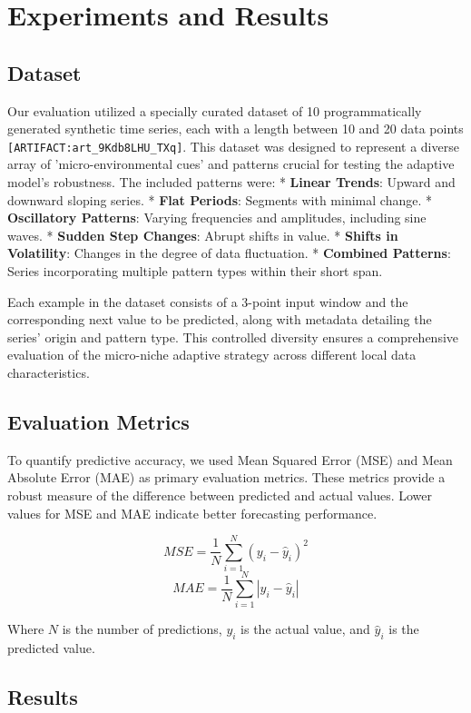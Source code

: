\documentclass[11pt,letterpaper]{article}
\begin{document}
\section{Experiments and Results}

\subsection{Dataset}

Our evaluation utilized a specially curated dataset of 10 programmatically generated synthetic time series, each with a length between 10 and 20 data points \texttt{[ARTIFACT:art\_9Kdb8LHU\_TXq]}. This dataset was designed to represent a diverse array of 'micro-environmental cues' and patterns crucial for testing the adaptive model's robustness. The included patterns were:
*   \textbf{Linear Trends}: Upward and downward sloping series.
*   \textbf{Flat Periods}: Segments with minimal change.
*   \textbf{Oscillatory Patterns}: Varying frequencies and amplitudes, including sine waves.
*   \textbf{Sudden Step Changes}: Abrupt shifts in value.
*   \textbf{Shifts in Volatility}: Changes in the degree of data fluctuation.
*   \textbf{Combined Patterns}: Series incorporating multiple pattern types within their short span.

Each example in the dataset consists of a 3-point input window and the corresponding next value to be predicted, along with metadata detailing the series' origin and pattern type. This controlled diversity ensures a comprehensive evaluation of the micro-niche adaptive strategy across different local data characteristics.

\subsection{Evaluation Metrics}

To quantify predictive accuracy, we used Mean Squared Error (MSE) and Mean Absolute Error (MAE) as primary evaluation metrics. These metrics provide a robust measure of the difference between predicted and actual values. Lower values for MSE and MAE indicate better forecasting performance.

$$ MSE = \frac{1}{N} \sum_{i=1}^{N} (y_i - \hat{y}_i)^2 $$
$$ MAE = \frac{1}{N} \sum_{i=1}^{N} |y_i - \hat{y}_i| $$

Where $N$ is the number of predictions, $y_i$ is the actual value, and $\hat{y}_i$ is the predicted value.

\subsection{Results}
\end{document}
